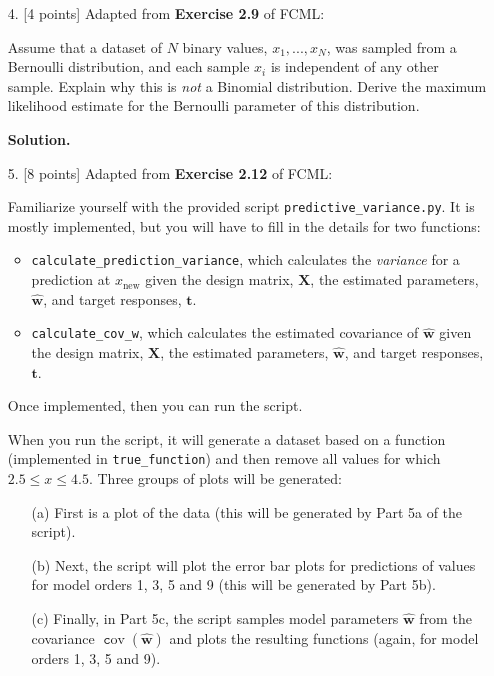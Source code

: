 \documentclass[10pt]{article}
\DeclareMathOperator{\cov}{\texttt cov}
\begin{document}
\begin{itemize}
{\bf Solution.}



\item[4.] [4 points]
Adapted from {\bf Exercise 2.9} of FCML:

Assume that a dataset of $N$ binary values, $x_1, ..., x_N$, was sampled from a Bernoulli distribution, and each sample $x_i$ is independent of any other sample.  Explain why this is {\em not} a Binomial distribution.  Derive the maximum likelihood estimate for the Bernoulli parameter of this distribution.

{\bf Solution.} 



\item[5.] [8 points]
Adapted from {\bf Exercise 2.12} of FCML:

Familiarize yourself with the provided script {\tt predictive\_variance.py}.  
It is mostly implemented, but you will have to fill in the details for two functions: 
\begin{itemize}
\item {\tt calculate\_prediction\_variance}, which calculates the {\em variance} for a prediction at $x_{\mathrm{new}}$ given the design matrix, $\mathbf{X}$, the estimated parameters, $\mathbf{\hat{w}}$, and target responses, $\mathbf{t}$.
\item {\tt calculate\_cov\_w}, which calculates the estimated covariance of $\mathbf{\hat{w}}$ given the design matrix, $\mathbf{X}$, the estimated parameters, $\mathbf{\hat{w}}$, and target responses, $\mathbf{t}$.
\end{itemize}
Once implemented, then you can run the script.

When you run the script, it will generate a dataset based on a function (implemented in {\tt true\_function}) and then remove all values for which 
$2.5 \leq x \leq 4.5$. %
Three groups of plots will be generated:
\begin{enumerate}
\item[(a)] First is a plot of the data (this will be generated by Part 5a of the script).  
\item[(b)] Next, the script will plot the error bar plots for predictions of values for model orders 1, 3, 5 and 9 (this will be generated by Part 5b).  
\item[(c)] Finally, in Part 5c, the script samples model parameters $\mathbf{\hat{w}}$ from the covariance $\cov(\mathbf{\hat{w}})$ and plots the resulting functions (again, for model orders 1, 3, 5 and 9).
\end{enumerate}


\end{itemize}
\end{document}
